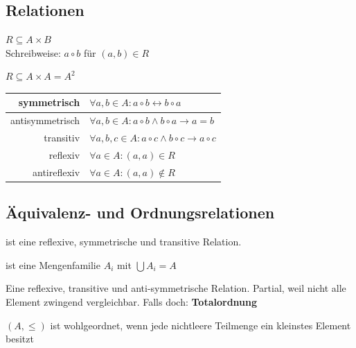 \documentclass[a4paper]{article}
\begin{document}
\subsection{Relationen}
	\begin{multicols}{2}
	
	\begin{fdef}
	    $R \subseteq A \times B$ \\
	    Schreibweise: $a \circ b$ für $(a, b) \in R$
	\end{fdef}
	\begin{fdef}
	    $R \subseteq A \times A = A^2$
	\end{fdef}
	
	\begin{feig}
		\renewcommand{\arraystretch}{1.3}
		\begin{tabular}{r|l}
			symmetrisch     &   $\forall a,b \in A: a \circ b \leftrightarrow b \circ a$\\\hline
			antisymmetrisch &   $\forall a,b \in A: a \circ b \wedge b \circ a \rightarrow a = b$\\\hline
			transitiv       &   $\forall a,b,c \in A: a \circ c \wedge b \circ c \rightarrow a \circ c$ \\\hline
			reflexiv        &   $\forall a \in A: (a,a) \in R$\\\hline
			antireflexiv    &   $\forall a \in A: (a,a) \notin R$
		\end{tabular}
	\end{feig}

	\end{multicols}

\newpage
\subsection{Äquivalenz- und Ordnungsrelationen}
	\begin{multicols}{2}
	
	\begin{fdef}[Äquivalenzrelation]
	ist eine reflexive, symmetrische und transitive Relation.
	\end{fdef}
	
	\begin{fdef}[Partition]
	    ist eine Mengenfamilie $A_i$ mit $\bigcup A_i = A$
	\end{fdef}

	\begin{fdef}[Partialordnung]
	    Eine reflexive, transitive und anti-symmetrische Relation.
	    Partial, weil nicht alle Element zwingend vergleichbar. Falls doch: \textbf{Totalordnung}
	\end{fdef}
	
	\begin{feig}[Wohlgeordnet]
	    $(A, \le)$ ist wohlgeordnet, wenn jede nichtleere Teilmenge ein kleinstes Element besitzt
	\end{feig}

	\end{multicols}
\end{document}
